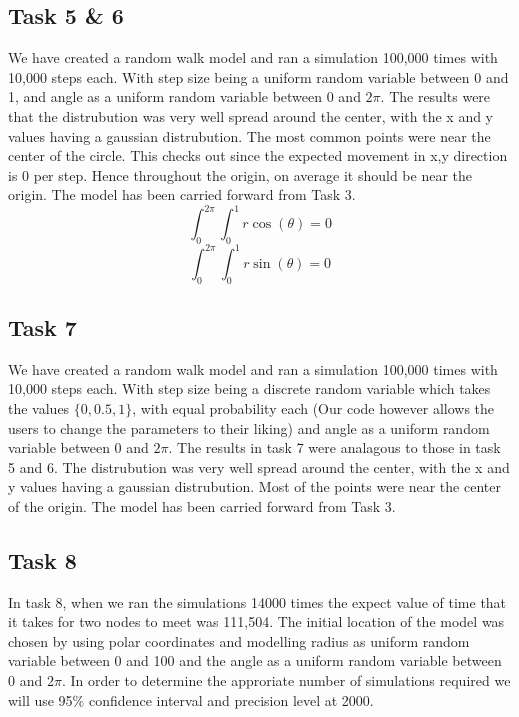 \documentclass[a4paper, 11pt]{book} %
\begin{document}
\subsection*{Task 5 \& 6}
We have created a random walk model and ran a simulation 100,000 times with 10,000 steps each. With step size being a uniform random variable between 0 and 1, and angle as a uniform random variable between 0 and \(2 \pi\). The results were that the distrubution was very well spread around the center, with the x and y values having a gaussian distrubution. The most common points were near the center of the circle. This checks out since the expected movement in x,y direction is 0 per step. Hence throughout the origin, on average it should be near the origin.  The model has been carried forward from Task 3.
\[\int^{2\pi}_{0} \int^{1}_{0} r \cos (\theta) = 0\]
\[\int^{2\pi}_{0} \int^{1}_{0} r \sin (\theta) = 0\]


\subsection*{Task 7}
We have created a random walk model and ran a simulation 100,000 times with 10,000 steps each. With step size being a discrete random variable which takes the values $\{0,0.5,1\}$, with equal probability each (Our code however allows the users to change the parameters to their liking) and angle as a uniform random variable between 0 and \(2 \pi\). The results in task 7 were analagous to those in task 5 and 6. The distrubution was very well spread around the center, with the x and y values having a gaussian distrubution. Most of the points were near the center of the origin. The model has been carried forward from Task 3.
\subsection*{Task 8}

In task 8, when we ran the simulations 14000 times the expect value of time that it takes for two nodes to meet was 111,504. 
The initial location of the model was chosen by using polar coordinates and modelling radius as uniform random variable
between 0 and 100 and the angle as a uniform random variable between 0 and $2\pi$. In order to determine the approriate number of simulations
required we will use 95\%  confidence interval and precision level at 2000. \\
\end{document}
